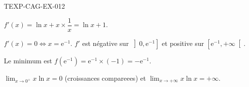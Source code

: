 \begin{corrige}{TEXP-CAG-EX-012}

$f'(x) = \ln x + x \times \dfrac{1}{x} = \ln x + 1$.


$f'(x) = 0 \iff x = \mathrm{e}^{-1}$. $f'$ est négative sur $\left]0, \mathrm{e}^{-1}\right]$ et positive sur $\left[\mathrm{e}^{-1}, +\infty\right[$.

Le minimum est $f(\mathrm{e}^{-1}) = \mathrm{e}^{-1} \times (-1) = -\mathrm{e}^{-1}$.

$\lim_{x \to 0^+} x\ln x = 0$ (croissances compareees) et $\lim_{x \to +\infty} x\ln x = +\infty$.

\end{corrige}
